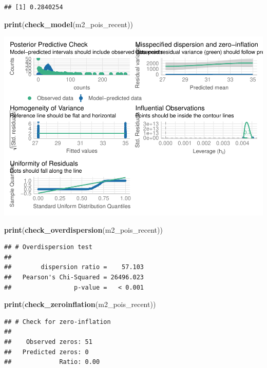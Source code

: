 \documentclass[
]{article}
\newenvironment{Shaded}{\begin{snugshade}}{\end{snugshade}}
\newcommand{\FunctionTok}[1]{\textcolor[rgb]{0.13,0.29,0.53}{\textbf{#1}}}
\newcommand{\NormalTok}[1]{#1}
\begin{document}
\begin{verbatim}
## [1] 0.2840254
\end{verbatim}

\begin{Shaded}
\begin{Highlighting}[]
\FunctionTok{print}\NormalTok{(}\FunctionTok{check\_model}\NormalTok{(m2\_pois\_recent))}
\end{Highlighting}
\end{Shaded}

\includegraphics{hw1-lobstrs-eds241_files/figure-latex/unnamed-chunk-36-1.pdf}

\begin{Shaded}
\begin{Highlighting}[]
\FunctionTok{print}\NormalTok{(}\FunctionTok{check\_overdispersion}\NormalTok{(m2\_pois\_recent))}
\end{Highlighting}
\end{Shaded}

\begin{verbatim}
## # Overdispersion test
## 
##        dispersion ratio =    57.103
##   Pearson's Chi-Squared = 26496.023
##                 p-value =   < 0.001
\end{verbatim}

\begin{Shaded}
\begin{Highlighting}[]
\FunctionTok{print}\NormalTok{(}\FunctionTok{check\_zeroinflation}\NormalTok{(m2\_pois\_recent))}
\end{Highlighting}
\end{Shaded}

\begin{verbatim}
## # Check for zero-inflation
## 
##    Observed zeros: 51
##   Predicted zeros: 0
##             Ratio: 0.00
\end{verbatim}
\end{document}
